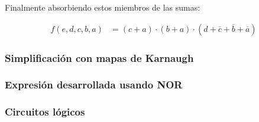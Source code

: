 Finalmente absorbiendo estos miembros de las sumas:

\begin{equation*}
    \begin{align*}
    f(e,d,c,b,a) & = {(c+a)}
    \cdot {(b+a)}
    \cdot {(d+\overline{c}+\overline{b}+\overline{a})} 
    \end{align*}
    \end{equation*}

\subsubsection{Simplificación con mapas de Karnaugh}

\subsubsection{Expresión desarrollada usando NOR}

\subsubsection{Circuitos lógicos}
